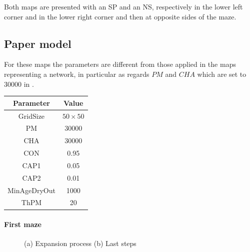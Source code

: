 Both maps are presented with an SP and an NS, respectively in the lower left corner and in the lower right corner and then at opposite sides of the maze.

\subsection{Paper model}

For these maps the parameters are different from those applied in the maps representing a network, in particular as regards $PM$ and $CHA$ which are set to 30000 in \cite{dourvas2016gpgpu}.

\begin{center}
 \begin{tabular}{||c c||} 
 \hline
 Parameter & Value \\ [0.5ex] 
 \hline\hline
 GridSize & $50 \times 50$ \\ 
 \hline
 PM & 30000 \\ 
 \hline
 CHA & 30000 \\ 
 \hline
 CON & 0.95 \\ 
 \hline
 CAP1 & 0.05 \\ 
 \hline
 CAP2 & 0.01 \\ 
 \hline
 MinAgeDryOut & 1000 \\
 \hline
 ThPM & 20 \\ [1ex] 
 \hline
 \end{tabular}
\end{center}

\paragraph{First maze}

\begin{figure}[H]
    \centering
    \caption{(a) Expansion process (b) Last steps}
    \label{fig:foobar}
\end{figure}

